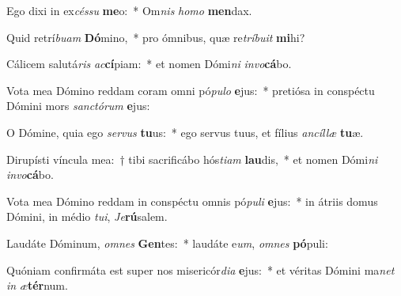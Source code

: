 \item Ego dixi in ex\textit{cés}\textit{su} \textbf{me}o:~* Om\textit{nis} \textit{ho}\textit{mo} \textbf{men}dax.
\item Quid retrí\textit{bu}\textit{am} \textbf{Dó}mino,~* pro ómnibus, quæ re\textit{trí}\textit{bu}\textit{it} \textbf{mi}hi?
\item Cálicem salutá\textit{ris} \textit{ac}\textbf{cí}piam:~* et nomen Dómi\textit{ni} \textit{in}\textit{vo}\textbf{cá}bo.
\item Vota mea Dómino reddam coram omni pó\textit{pu}\textit{lo} \textbf{e}jus:~* pretiósa in conspéctu Dómini mors \textit{sanc}\textit{tó}\textit{rum} \textbf{e}jus:
\item O Dómine, quia ego \textit{ser}\textit{vus} \textbf{tu}us:~* ego servus tuus, et fílius \textit{an}\textit{cíl}\textit{læ} \textbf{tu}æ.
\item Dirupísti víncula mea:~† tibi sacrificábo hós\textit{ti}\textit{am} \textbf{lau}dis,~* et nomen Dómi\textit{ni} \textit{in}\textit{vo}\textbf{cá}bo.
\item Vota mea Dómino reddam in conspéctu omnis pó\textit{pu}\textit{li} \textbf{e}jus:~* in átriis domus Dómini, in médio \textit{tu}\textit{i}, \textit{Je}\textbf{rú}salem.
\item Laudáte Dóminum, \textit{om}\textit{nes} \textbf{Gen}tes:~* laudáte e\textit{um}, \textit{om}\textit{nes} \textbf{pó}puli:
\item Quóniam confirmáta est super nos misericór\textit{di}\textit{a} \textbf{e}jus:~* et véritas Dómini ma\textit{net} \textit{in} \textit{æ}\textbf{tér}num.
